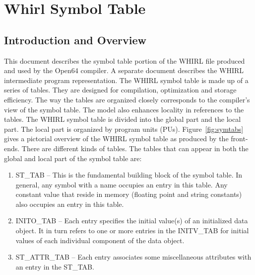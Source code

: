 
%
\chapter{Whirl Symbol Table}
\label{chap:symtab}


\section{Introduction and Overview}

This document describes the symbol table portion of the WHIRL file
produced and used by the Open64 compiler. A separate document
describes the WHIRL intermediate program representation. The WHIRL
symbol table is made up of a series of tables. They are designed for
compilation, optimization and storage efficiency. The way the tables
are organized closely corresponds to the compiler's view of the symbol
table. The model also enhances locality in references to the
tables. The WHIRL symbol table is divided into the global part and the
local part. The local part is organized by program units
(PUs). Figure~\ref{fig:symtabs}
gives a pictorial overview of the WHIRL symbol table as produced by
the front-ends. There are different kinds of tables. The 
tables that can appear in both the 
global and local part of the symbol table are:

\begin{enumerate}
\item
{}%
ST\_TAB -- This is the fundamental building block of the symbol
  table. In general, any symbol with a name occupies an entry in this
  table.  Any constant value that reside in memory (floating point
  and string constants) also occupies an entry in this table.

\item
{}%
INITO\_TAB -- Each entry specifies the initial value(s) of an
  initialized data object. It in turn refers to one or more entries in
the
%
INITV\_TAB for initial values of each individual component of
  the data object.

\item
{}%
ST\_ATTR\_TAB -- Each entry associates some miscellaneous
  attributes with an entry in the ST\_TAB.
\end{enumerate}

